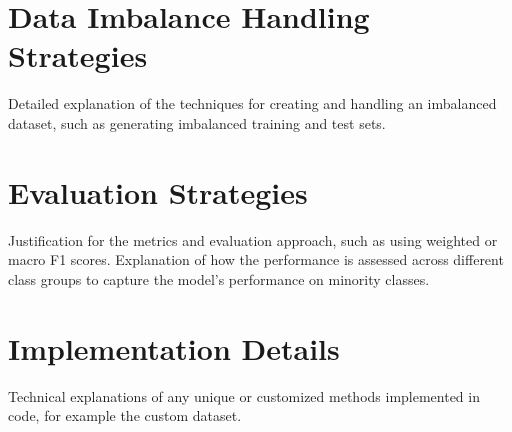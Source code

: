 \section{Data Imbalance Handling Strategies}
Detailed explanation of the techniques for creating and handling an imbalanced dataset, such as generating imbalanced training and test sets.


\section{Evaluation Strategies}
Justification for the metrics and evaluation approach, such as using weighted or macro F1 scores.
Explanation of how the performance is assessed across different class groups to capture the model’s performance on minority classes.

\section{Implementation Details}
Technical explanations of any unique or customized methods implemented in code, for example the custom dataset.


